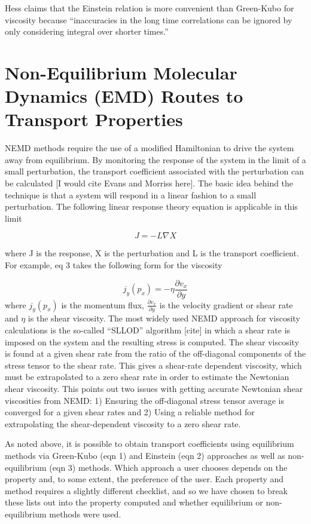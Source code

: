 \documentclass[9pt]{livecoms}
\begin{document}
Hess claims that the Einstein relation is more convenient than Green-Kubo for viscosity because ``inaccuracies in the long time correlations can be ignored by only considering integral over shorter times.'' 

\section{Non-Equilibrium Molecular Dynamics (EMD) Routes to Transport Properties}

NEMD methods require the use of a modified Hamiltonian to drive the system away from equilibrium. By monitoring the response of the system in the limit of a small perturbation, the transport coefficient associated with the perturbation can be calculated [I would cite Evans and Morriss here]. The basic idea behind the technique is that a system will respond in a linear fashion to a small perturbation. The following linear response theory equation is applicable in this limit

\begin{equation}
J = -L \nabla X
\end{equation}

where J is the response, X is the perturbation and L is the transport coefficient. For example, eq 3 takes the following form for the viscosity

\begin{equation}
j_y(p_x) = -\eta \frac{\partial v_x}{\partial y}
\end{equation}
where $j_y(p_x)$ is the momentum flux, $\frac{\partial v_x}{\partial y}$ is the velocity gradient or shear rate and $\eta$ is the shear viscosity.  The most widely used NEMD approach for viscosity calculations is the so-called “SLLOD” algorithm [cite] in which a shear rate is imposed on the system and the resulting stress is computed. The shear viscosity is found at a given shear rate from the ratio of the off-diagonal components of the stress tensor to the shear rate. This gives a shear-rate dependent viscosity, which must be extrapolated to a zero shear rate in order to estimate the Newtonian shear viscosity. This points out two issues with getting accurate Newtonian shear viscosities from NEMD: 1) Ensuring the off-diagonal stress tensor average is converged for a given shear rates and 2) Using a reliable method for extrapolating the shear-dependent viscosity to a zero shear rate. 

As noted above, it is possible to obtain transport coefficients using equilibrium methods via Green-Kubo (eqn 1) and Einstein (eqn 2) approaches as well as non-equilibrium (eqn 3) methods. Which approach a user chooses depends on the property and, to some extent, the preference of the user. Each property and method requires a slightly different checklist, and so we have chosen to break these lists out into the property computed and whether equilibrium or non-equilibrium methods were used.
\end{document}
